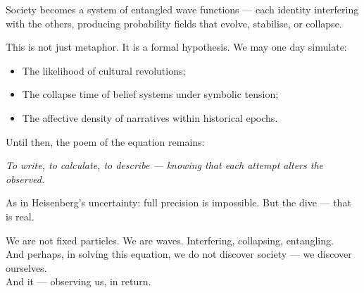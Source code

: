 Society becomes a system of entangled wave functions — each identity interfering with the others, producing probability fields that evolve, stabilise, or collapse.

This is not just metaphor. It is a formal hypothesis. We may one day simulate:
\begin{itemize}
  \item The likelihood of cultural revolutions;
  \item The collapse time of belief systems under symbolic tension;
  \item The affective density of narratives within historical epochs.
\end{itemize}

Until then, the poem of the equation remains:

\textit{To write, to calculate, to describe — knowing that each attempt alters the observed.}

As in Heisenberg’s uncertainty: full precision is impossible. But the dive — that is real.

We are not fixed particles. We are waves. Interfering, collapsing, entangling.\\
And perhaps, in solving this equation, we do not discover society — we discover ourselves.\\
And it — observing us, in return.